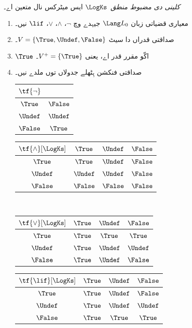 \documentclass[../../../include/open-logic-section]{subfiles}
\begin{document}
\begin{defn}
\emph{کلینی دی مضبوط منطق}~$\LogKs$ ایس میٹرکس نال متعین اے۔
\begin{enumerate}
  \item معیاری قضیاتی زبان $\Lang L_0$ جیہدے وچ
  $\lnot$، $\land$، $\lor$، $\lif$ نیں۔
  \item صداقتی قدراں دا سیٹ $V = \{\True, \Undef, \False\}$۔
  \item $\True$ اکّو مقرر قدر اے، یعنی $V^+ = \{\True\}$۔
  \item صداقتی فنکشن ہِٹھلے جدولاں توں ملدے نیں۔
  \begin{center}
    \begin{tabular}{c|c} 
      $\tf{\lnot}$ & \\ 
      \hline  
      $\True$ & $\False$ \\ 
      $\Undef$ & $\Undef$ \\
      $\False$ & $\True$ 
    \end{tabular}
    \quad
    \begin{tabular}{c|ccc} 
      $\tf{\land}[\LogKs]$ & $\True$ & $\Undef$ & $\False$ \\ 
      \hline 
      $\True$ & $\True$ & $\Undef$ & $\False$ \\ 
      $\Undef$ & $\Undef$ & $\Undef$ & $\False$\\ 
      $\False$ & $\False$ & $\False$ & $\False$ 
    \end{tabular}
    \\[2ex]
    \begin{tabular}{c|ccc} 
      $\tf{\lor}[\LogKs]$ & $\True$ & $\Undef$ & $\False$ \\ 
      \hline 
      $\True$ & $\True$ & $\True$ & $\True$ \\ 
      $\Undef$ & $\True$ & $\Undef$ & $\Undef$ \\
      $\False$ & $\True$ & $\Undef$ & $\False$ 
    \end{tabular}
    \quad
    \begin{tabular}{c|ccc} 
      $\tf{\lif}[\LogKs]$ & $\True$ & $\Undef$ & $\False$ \\ 
      \hline 
      $\True$ & $\True$ & $\Undef$ & $\False$ \\ 
      $\Undef$ & $\True$ & $\Undef$ & $\Undef$  \\ 
      $\False$ & $\True$ & $\True$ & $\True$ 
    \end{tabular}
  \end{center}
\end{enumerate}
\end{defn}
\end{document}
